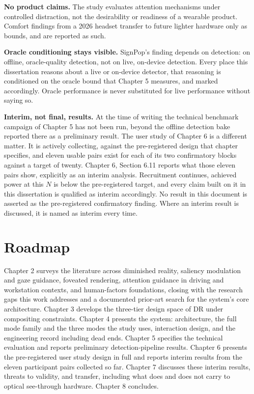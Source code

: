 \textbf{No product claims.} The study evaluates attention mechanisms under controlled distraction, not the
desirability or readiness of a wearable product. Comfort findings from a 2026 headset transfer to
future lighter hardware only as bounds, and are reported as such.

\textbf{Oracle conditioning stays visible.} SignPop's finding depends on detection: on offline,
oracle-quality detection, not on live, on-device detection. Every place this dissertation reasons
about a live or on-device detector, that reasoning is conditioned on the oracle bound that Chapter 5
measures, and marked accordingly. Oracle performance is never substituted for live performance
without saying so.

\textbf{Interim, not final, results.} At the time of writing the technical benchmark campaign of
Chapter 5 has not been run, beyond the offline detection bake reported there as a preliminary result.
The user study of Chapter 6 is a different matter. It is actively collecting, against the
pre-registered design that chapter specifies, and eleven usable pairs exist for each of its two
confirmatory blocks against a target of twenty. Chapter 6, Section 6.11 reports what those eleven
pairs show, explicitly as an interim analysis. Recruitment continues, achieved power at this $N$ is
below the pre-registered target, and every claim built on it in this dissertation is qualified as
interim accordingly. No result in this document is asserted as the pre-registered confirmatory
finding. Where an interim result is discussed, it is named as interim every time.

\section{Roadmap}

Chapter 2 surveys the literature across diminished reality, saliency modulation and gaze guidance,
foveated rendering, attention guidance in driving and workstation contexts, and human-factors
foundations, closing with the research gaps this work addresses and a documented prior-art search for
the system's core architecture. Chapter 3 develops the three-tier design space of DR under
compositing constraints. Chapter 4 presents the system: architecture, the full mode family and the
three modes the study uses, interaction design, and the engineering record including dead ends. Chapter 5 specifies the technical evaluation
and reports preliminary detection-pipeline results. Chapter 6 presents the pre-registered user study
design in full and reports interim results from the eleven participant pairs collected so far.
Chapter 7 discusses these interim results, threats to validity, and transfer, including what does
and does not carry to optical see-through hardware. Chapter 8 concludes.

